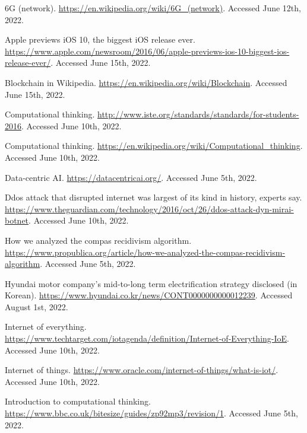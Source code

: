 \documentclass[11pt]{article}
\begin{document}
\begin{thebibliography}{10}

6{G} (network).
\newblock \url{https://en.wikipedia.org/wiki/6G_(network)}.
\newblock Accessed June 12th, 2022.

Apple previews {iOS} 10, the biggest {iOS} release ever.
\newblock
  \url{https://www.apple.com/newsroom/2016/06/apple-previews-ios-10-biggest-ios-release-ever/}.
\newblock Accessed June 15th, 2022.

Blockchain in {W}ikipedia.
\newblock \url{https://en.wikipedia.org/wiki/Blockchain}.
\newblock Accessed June 15th, 2022.

Computational thinking.
\newblock \url{http://www.iste.org/standards/standards/for-students-2016}.
\newblock Accessed June 10th, 2022.

Computational thinking.
\newblock \url{https://en.wikipedia.org/wiki/Computational_thinking}.
\newblock Accessed June 10th, 2022.

Data-centric {AI}.
\newblock \url{https://datacentricai.org/}.
\newblock Accessed June 5th, 2022.

Ddos attack that disrupted internet was largest of its kind in history, experts
  say.
\newblock
  \url{https://www.theguardian.com/technology/2016/oct/26/ddos-attack-dyn-mirai-botnet}.
\newblock Accessed June 10th, 2022.

How we analyzed the compas recidivism algorithm.
\newblock
  \url{https://www.propublica.org/article/how-we-analyzed-the-compas-recidivism-algorithm}.
\newblock Accessed June 5th, 2022.

Hyundai motor company's mid-to-long term electrification strategy disclosed (in
  {K}orean).
\newblock \url{https://www.hyundai.co.kr/news/CONT0000000000012239}.
\newblock Accessed August 1st, 2022.

Internet of everything.
\newblock
  \url{https://www.techtarget.com/iotagenda/definition/Internet-of-Everything-IoE}.
\newblock Accessed June 10th, 2022.

Internet of things.
\newblock \url{https://www.oracle.com/internet-of-things/what-is-iot/}.
\newblock Accessed June 10th, 2022.

Introduction to computational thinking.
\newblock \url{https://www.bbc.co.uk/bitesize/guides/zp92mp3/revision/1}.
\newblock Accessed June 5th, 2022.


\end{thebibliography}
\end{document}
